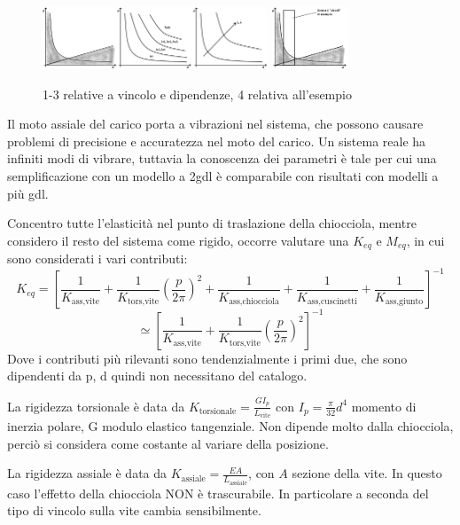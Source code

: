 \begin{figure}[h]
    \centering
    \includegraphics[width=0.6\textwidth]{Immagini/viti_ricir_vincoli_p_d.png}
    \includegraphics[width=0.2\textwidth]{Immagini/viti_ricir_esempio_vincoli.png}
    \caption{1-3 relative a vincolo e dipendenze, 4 relativa all'esempio}
\end{figure}

Il moto assiale del carico porta a vibrazioni nel sistema, che possono causare problemi di precisione e accuratezza nel moto del carico.
Un sistema reale ha infiniti modi di vibrare, tuttavia la conoscenza dei parametri è tale per cui una semplificazione con un modello a 2gdl è comparabile con risultati con modelli a più gdl.

Concentro tutte l'elasticità nel punto di traslazione della chiocciola, mentre considero il resto del sistema come rigido, occorre valutare una \(K_{eq}\) e \( M_{eq} \), in cui sono considerati i vari contributi:
\[ K_{eq} = \left[ \frac{1}{K_\text{ass,vite}} + \frac{1}{K_\text{tors,vite}}\left(\frac{p}{2\pi}\right)^2 + \frac{1}{K_\text{ass,chiocciola}} + \frac{1}{K_\text{ass,cuscinetti}} + \frac{1}{K_\text{ass,giunto}} \right]^{-1} \] \[ \simeq \left[ \frac{1}{K_\text{ass,vite}} + \frac{1}{K_\text{tors,vite}}\left(\frac{p}{2\pi}\right)^2 \right]^{-1} \]
Dove i contributi più rilevanti sono tendenzialmente i primi due, che sono dipendenti da p, d quindi non necessitano del catalogo.

La rigidezza torsionale è data da \(K_\text{torsionale} = \frac{G I_p}{L_\text{vite}} \) con \(I_p=\frac{\pi}{32} d^4\) momento di inerzia polare, G modulo elastico tangenziale.
Non dipende molto dalla chiocciola, perciò si considera come costante al variare della posizione.

La rigidezza assiale è data da \( K_\text{assiale} = \frac{EA}{L_\text{assiale}} \), con \( A \) sezione della vite.
In questo caso l'effetto della chiocciola NON è trascurabile.
In particolare a seconda del tipo di vincolo sulla vite cambia sensibilmente.

